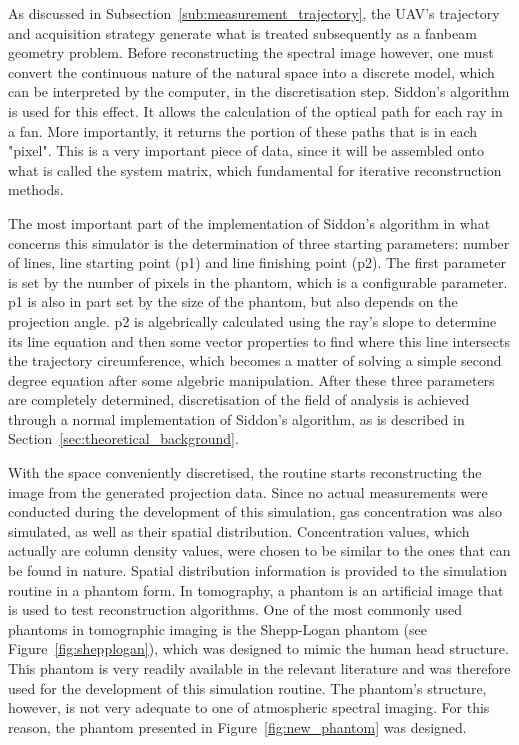 As discussed in Subsection~\ref{sub:measurement_trajectory}, the UAV's
trajectory and acquisition strategy generate what is treated
subsequently as a fanbeam geometry problem. Before reconstructing the
spectral image however, one must convert the continuous nature of the
natural space into a discrete model, which can be interpreted by the
computer, in the discretisation step. Siddon's algorithm is used for
this effect. It allows the calculation of the optical path for each ray
in a fan. More importantly, it returns the portion of these paths that
is in each "pixel". This is a very important piece of data, since it
will be assembled onto what is called the system matrix, which
fundamental for iterative reconstruction methods.

The most important part of the implementation of Siddon's algorithm in
what concerns this simulator is the determination of three starting
parameters: number of lines, line starting point (p1) and line finishing
point (p2). The first parameter is set by the number of pixels in the
phantom, which is a configurable parameter. p1 is also in part set by
the size of the phantom, but also depends on the projection angle. p2 is
algebrically calculated using the ray's slope to determine its line
equation and then some vector properties to find where this line
intersects the trajectory circumference, which becomes a matter of
solving a simple second degree equation after some algebric
manipulation. After these three parameters are completely determined,
discretisation of the field of analysis is achieved through a normal
implementation of Siddon's algorithm, as is described in
Section~\ref{sec:theoretical_background}.

With the space conveniently discretised, the routine starts
reconstructing the image from the generated projection data. Since no
actual measurements were conducted during the development of this
simulation, gas concentration was also simulated, as well as their
spatial distribution. Concentration values, which actually are column
density values, were chosen to be similar to the ones that can be found
in nature. Spatial distribution information is provided to the
simulation routine in a phantom form. In tomography, a phantom is an
artificial image that is used to test reconstruction algorithms. One of
the most commonly used phantoms in tomographic imaging is the
Shepp-Logan phantom (see Figure~\ref{fig:shepplogan}), which was
designed to mimic the human head structure. This phantom is very readily
available in the relevant literature and was therefore used for the
development of this simulation routine. The phantom's structure,
however, is not very adequate to one of atmospheric spectral imaging.
For this reason, the phantom presented in Figure~\ref{fig:new_phantom}
was designed.

